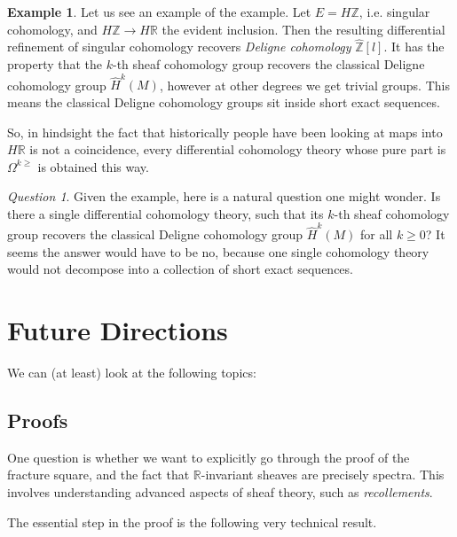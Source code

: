 \documentclass[10pt]{amsart}
\newcommand{\bR}{\mathbb{R}}
\newcommand{\bZ}{\mathbb{Z}}
\theoremstyle{definition}
\newtheorem{example}[equation]{Example}
\theoremstyle{remark}
\newtheorem{question}[section]{Question}
\numberwithin{equation}{section}
\begin{document}
\begin{example}
 Let us see an example of the example. Let $E = H\bZ$, i.e. singular cohomology, and $H\bZ \to H\bR$ the evident inclusion. Then the resulting differential refinement of singular cohomology recovers \emph{Deligne cohomology} $\hat{\bZ}[l]$. It has the property that the $k$-th sheaf cohomology group recovers the classical Deligne cohomology group $\hat{H}^k(M)$, however at other degrees we get trivial groups. This means the classical Deligne cohomology groups sit inside short exact sequences.
\end{example}

So, in hindsight the fact that historically people have been looking at maps into $H\bR$ is not a coincidence, every differential cohomology theory whose pure part is $\Omega^{k \geq}$ is obtained this way.

\begin{question}
 Given the example, here is a natural question one might wonder. Is there a single differential cohomology theory, such that its $k$-th sheaf cohomology group recovers the classical Deligne cohomology group $\hat{H}^k(M)$ for all $k \geq 0$? It seems the answer would have to be no, because one single cohomology theory would not decompose into a collection of short exact sequences.
\end{question}


\section{Future Directions}
We can (at least) look at the following topics:

\subsection{Proofs}
One question is whether we want to explicitly go through the proof of the fracture square, and the fact that $\bR$-invariant sheaves are precisely spectra. This involves understanding advanced aspects of sheaf theory, such as \emph{recollements}.

The essential step in the proof is the following very technical result.
\end{document}

